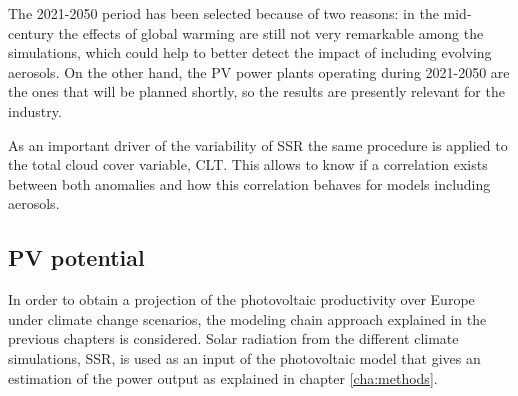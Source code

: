 The 2021-2050 period has been selected because of two reasons: in the mid-century the effects of global warming are still not very remarkable among the simulations, which could help to better detect the impact of including evolving aerosols. On the other hand, the PV power plants operating during 2021-2050 are the ones that will be planned shortly, so the results are presently relevant for the industry.

As an important driver of the variability of SSR the same procedure is applied to the total cloud cover variable, CLT. This allows to know if a correlation exists between both anomalies and how this correlation behaves for models including aerosols.





\subsection{PV potential}

In order to obtain a projection of the photovoltaic productivity over Europe under climate change scenarios, the modeling chain approach explained in the previous chapters is considered. Solar radiation from the different climate simulations, SSR, is used as an input of the photovoltaic model that gives an estimation of the power output as explained in chapter \ref{cha:methods}.


